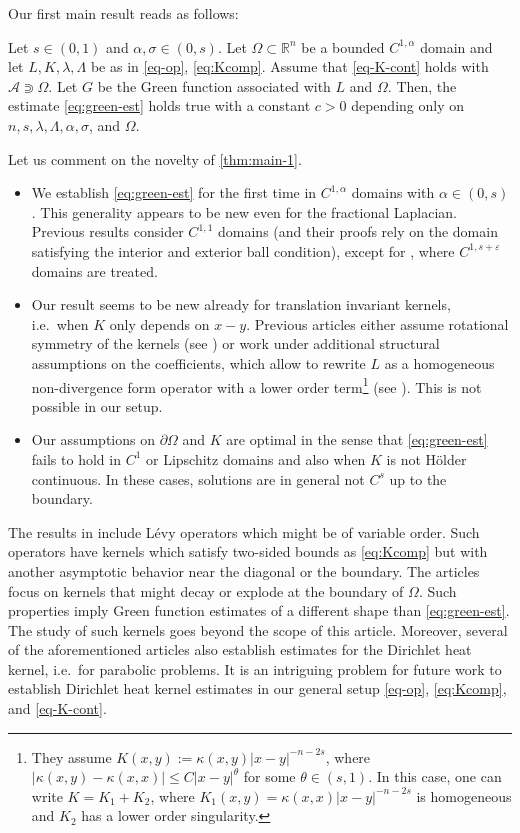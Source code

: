 \documentclass[11pt,reqno]{amsart}
\theoremstyle{plain}
\theoremstyle{definition}
\numberwithin{equation}{section}
\newcommand{\R}{\mathbb{R}}
\newcommand{\eps}{\varepsilon}
\newcommand{\1}{\mathbbm{1}}
\begin{document}
Our first main result reads as follows:

\begin{theorem}
\label{thm:main-1}
    Let $s \in (0,1)$ and $\alpha,\sigma \in (0,s)$. Let $\Omega \subset \R^n$ be a bounded $C^{1,\alpha}$ domain and let $L,K, \lambda, \Lambda$ be as in \eqref{eq-op}, \eqref{eq:Kcomp}. Assume that \eqref{eq-K-cont} holds with $\mathcal{A} \Supset \Omega$. Let $G$ be the Green function associated with $L$ and $\Omega$. Then, the estimate \eqref{eq:green-est} holds true with a constant $c > 0$ depending only on $n,s,\lambda,\Lambda,\alpha,\sigma$, and $\Omega$.
\end{theorem}


Let us comment on the novelty of \autoref{thm:main-1}.

\begin{itemize}
    \item We establish \eqref{eq:green-est} for the first time in $C^{1,\alpha}$ domains with $\alpha \in (0,s)$. This generality appears to be new even for the fractional Laplacian. Previous results consider $C^{1,1}$ domains (and their proofs rely on the domain satisfying the interior and exterior ball condition), except for \cite{KiKi14}, where $C^{1,s+\eps}$ domains are treated.
    \item Our result seems to be new already for translation invariant kernels, i.e.\ when $K$ only depends on $x-y$. Previous articles either assume rotational symmetry of the kernels (see \cite{CKS14,BGR14,KiMi18}) or work under additional structural assumptions on the coefficients, which allow to rewrite $L$ as a homogeneous non-divergence form operator with a lower order term\footnote{They assume $K(x,y) := \kappa(x,y)|x-y|^{-n-2s}$, where $|\kappa(x,y) - \kappa(x,x)| \le C |x-y|^{\theta}$ for some $\theta \in (s,1)$. In this case, one can write $K = K_1 + K_2$, where $K_1(x,y) = \kappa(x,x) |x-y|^{-n-2s}$ is homogeneous and $K_2$ has a lower order singularity.} (see \cite{KiKi14,Kim15,GKK20,KSV25,CKSV24,KSV24}). This is not possible in our setup.
    \item Our assumptions on $\partial \Omega$ and $K$ are optimal in the sense that \eqref{eq:green-est} fails to hold in $C^1$ or Lipschitz domains and also when $K$ is not H\"older continuous. In these cases, solutions are in general not $C^s$ up to the boundary.
\end{itemize}


The results in \cite{CKS14,BGR14,KiMi18,CHZ25} include L\'evy operators which might be of variable order. Such operators have kernels which satisfy two-sided bounds as \eqref{eq:Kcomp} but with another asymptotic behavior near the diagonal or the boundary. The articles \cite{KSV25,CKSV24,KSV24} focus on kernels that might decay or explode at the boundary of $\Omega$. Such properties imply Green function estimates of a different shape than \eqref{eq:green-est}. The study of such kernels goes beyond the scope of this article. Moreover, several of the aforementioned articles also establish estimates for the Dirichlet heat kernel, i.e.\ for parabolic problems. It is an intriguing problem for future work to establish Dirichlet heat kernel estimates in our general setup \eqref{eq-op}, \eqref{eq:Kcomp}, and \eqref{eq-K-cont}.
\end{document}
